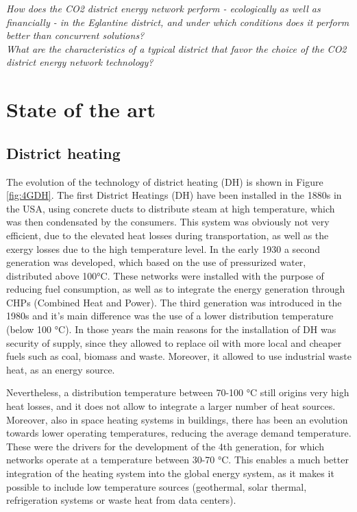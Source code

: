 \documentclass{article}
\begin{document}
\textit{How does the CO2 district energy network perform - ecologically as well as financially - in the Eglantine district, and under which conditions does it perform better than concurrent solutions?}\\

\textit{What are the characteristics of a typical district that favor the choice of the CO2 district energy network technology?}

\newpage
\section{State of the art}

\subsection{District heating}
The evolution of the technology of district heating (DH) is shown in Figure \ref{fig:4GDH}.
The first District Heatings (DH) have been installed in the 1880s in the USA, using concrete ducts to distribute steam at high temperature, which was then condensated by the consumers. This system was obviously not very efficient, due to the elevated heat losses during transportation, as well as the exergy losses due to the high temperature level. In the early 1930 a second generation was developed, which based on the use of pressurized water, distributed above 100\si{\celsius}. These networks were installed with the purpose of reducing fuel consumption, as well as to integrate the energy generation through CHPs (Combined Heat and Power). The third generation was introduced in the 1980s and it's main difference was the use of a lower distribution temperature (below 100 \si{\celsius}). In those years the main reasons for the installation of DH was security of supply, since they allowed to replace oil with more local and cheaper fuels such as coal, biomass and waste. Moreover, it allowed to use industrial waste heat, as an energy source. 

Nevertheless, a distribution temperature between 70-100 \si{\celsius} still origins very high heat losses, and it does not allow to integrate a larger number of heat sources. Moreover, also in space heating systems in buildings, there has been an evolution towards lower operating temperatures, reducing the average demand temperature. These were the drivers for the development of the 4th generation, for which networks operate at a temperature between 30-70 \si{\celsius}. This enables a much better integration of the heating system into the global energy system, as it makes it possible to include low temperature sources (geothermal, solar thermal, refrigeration systems or waste heat from data centers).
 
\end{document}
